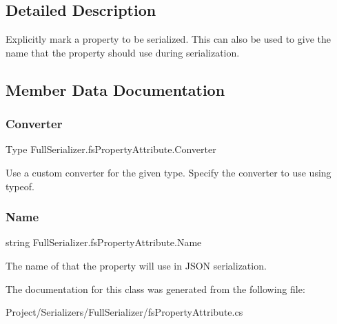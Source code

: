 \subsection{Detailed Description}
Explicitly mark a property to be serialized. This can also be used to give the name that the property should use during serialization. 



\subsection{Member Data Documentation}
\mbox{\label{class_full_serializer_1_1fs_property_attribute_aaaf462a84a2ab5cdca315894a11033bc}} 
\subsubsection{\texorpdfstring{Converter}{Converter}}
{\footnotesize\ttfamily Type Full\+Serializer.\+fs\+Property\+Attribute.\+Converter}



Use a custom converter for the given type. Specify the converter to use using typeof. 

\mbox{\label{class_full_serializer_1_1fs_property_attribute_ab1b4b66609dc00829628f6d8f07be273}} 
\subsubsection{\texorpdfstring{Name}{Name}}
{\footnotesize\ttfamily string Full\+Serializer.\+fs\+Property\+Attribute.\+Name}



The name of that the property will use in J\+S\+ON serialization. 



The documentation for this class was generated from the following file\+:\begin{DoxyCompactItemize}
\item 
Project/\+Serializers/\+Full\+Serializer/fs\+Property\+Attribute.\+cs\end{DoxyCompactItemize}
